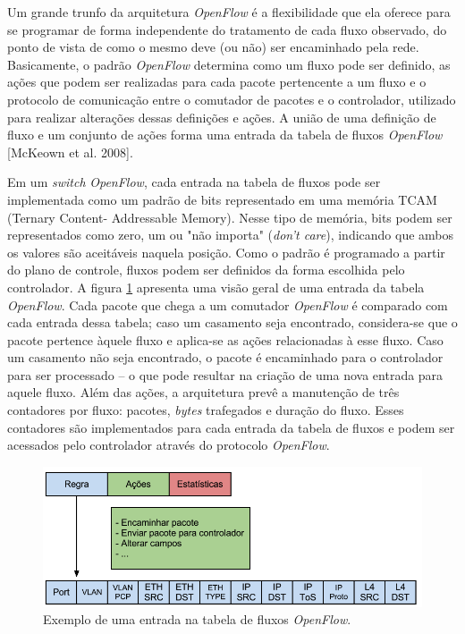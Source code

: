 Um grande trunfo da arquitetura \textit{OpenFlow} é a flexibilidade 
que ela oferece para se programar de forma independente do
tratamento de cada fluxo observado, do ponto de vista de como
o mesmo deve (ou não) ser encaminhado pela rede. Basicamente,
o padrão \textit{OpenFlow} determina como um fluxo pode ser definido,
as ações que podem ser realizadas para cada pacote pertencente
a um fluxo e o protocolo de comunicação entre o comutador de 
pacotes e o controlador, utilizado para realizar alterações dessas 
definições e ações. A união de uma definição de fluxo e um
conjunto de ações forma uma entrada da tabela de fluxos 
\textit{OpenFlow} [McKeown et al. 2008].

Em um \textit{switch} \textit{OpenFlow}, cada entrada na tabela de 
fluxos pode ser implementada como um padrão de bits 
representado em uma memória TCAM (Ternary Content-
Addressable Memory). Nesse tipo de memória, bits podem
ser representados como zero, um ou "não importa" 
(\textit{don't care}), indicando que ambos os valores são
aceitáveis naquela posição. Como o padrão é programado
a partir do plano de controle, fluxos podem ser definidos da 
forma escolhida pelo controlador. A figura \ref{fig:fluxoopenflow}
apresenta uma visão geral de uma entrada da tabela \textit{OpenFlow}.
Cada pacote que chega a um comutador \textit{OpenFlow} é comparado
com cada entrada dessa tabela; caso um casamento seja encontrado,
considera-se que o pacote pertence àquele fluxo e aplica-se
as ações relacionadas à esse fluxo. Caso um casamento não
seja encontrado, o pacote é encaminhado para o controlador 
para ser processado -- o que pode resultar na criação de uma
nova entrada para aquele fluxo. Além das ações, a arquitetura
prevê a manutenção de três contadores por fluxo: pacotes,
 \textit{bytes} trafegados e duração do fluxo. Esses contadores são 
implementados para cada entrada da tabela de fluxos e 
podem ser acessados pelo controlador através do protocolo
\textit{OpenFlow}.

\begin{figure}[hb] \centering
\includegraphics[width=160mm]{fluxoOpenflow.png} 
\caption{Exemplo de uma entrada na tabela de fluxos \textit{OpenFlow}.} 
\label{fig:fluxoopenflow} 
\end{figure}


